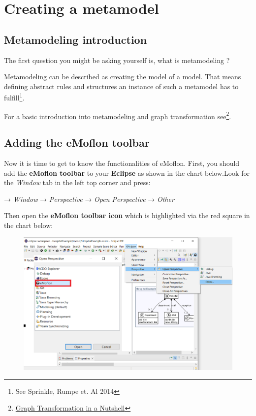 \section{Creating a metamodel}
\subsection{Metamodeling introduction}

The first question you might be asking yourself is, what is metamodeling ?

Metamodeling can be described as creating the model of a model. That means defining abstract rules and structures an instance of such a metamodel has to fulfill\footnote{See Sprinkle, Rumpe et. Al 2014 }.\newline

For a basic introduction into metamodeling and graph transformation see\footnote{\href{https://www.cs.le.ac.uk/people/rh122/papers/2006/Hec06Nutshell.pdf}{Graph Transformation in a Nutshell}}.

\subsection{Adding the eMoflon toolbar}

Now it is time to get to know the functionalities of eMoflon. First, you should add the \textbf{eMoflon toolbar} to your \textbf{Eclipse} as shown in the chart below.\newline Look for the \textit\textsf{Window} tab in the left top corner and press:\newline

\centering
→ \textit{\textsf{Window}} →
\textit{\textsf{Perspective}} → \textit{\textsf{Open Perspective}} → \textit{\textsf{Other}}
\newline

\raggedright
Then open the \textbf{eMoflon toolbar icon} which is highlighted via the red square in the chart below:\newline\newline
\begin{figure}[h]
    \centering
    \includegraphics[scale=0.4, width =\textwidth]{pictures/add_perspective.png}
    \caption{}
    \label{add toolbar}
\end{figure}

